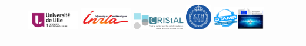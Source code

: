 \begin{titlepage}
\begin{center}
\vspace*{-2cm}
\begin{figure}[!htbp]
  \begin{center}
	\includegraphics[width=0.2\textwidth]{images/logo/lille1_logo.png}\hspace{0.2cm}
	\includegraphics[width=0.2\textwidth]{images/logo/logo-inria-scientifique-couleur.jpg}\hspace{0.2cm}
	\includegraphics[width=0.2\textwidth]{images/logo/logoCRIStAL.pdf}\hspace{0.2cm}
	\includegraphics[width=0.1\textwidth]{images/logo/kth.jpg}\hspace{0.2cm}
	\includegraphics[width=0.2\textwidth]{images/logo/logo_readme_md.png}
  \end{center}
\end{figure}
\hrule



\end{center}
\end{titlepage}
